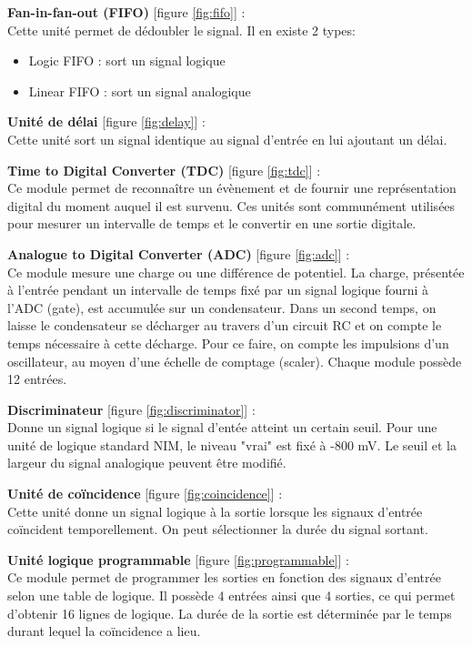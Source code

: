 \textbf{Fan-in-fan-out (FIFO)} [figure  \ref{fig:fifo}] :\\
Cette unité permet de dédoubler le signal. Il en existe 2 types:
\begin{itemize}
\item Logic FIFO : sort un signal logique
\item Linear FIFO : sort un signal analogique
\end{itemize}

\textbf{Unité de délai} [figure \ref{fig:delay}] :\\
Cette unité sort un signal identique au signal d'entrée en lui ajoutant un délai.

\textbf{Time to Digital Converter (TDC)} [figure \ref{fig:tdc}] :\\
Ce module permet de reconnaître un évènement et de fournir une représentation digital du moment auquel il est survenu. Ces unités sont communément utilisées pour mesurer un intervalle de temps et le convertir en une sortie digitale.

\textbf{Analogue to Digital Converter (ADC)} [figure \ref{fig:adc}] :\\
Ce module mesure une charge ou une différence de potentiel. 
La charge, présentée à l’entrée pendant un intervalle de temps fixé par un signal logique fourni à l’ADC (gate), est accumulée sur un condensateur. Dans un second temps, on laisse le condensateur se décharger au travers d’un circuit RC et on compte le temps nécessaire à cette décharge. Pour ce faire, on compte les impulsions d’un oscillateur, au moyen d’une échelle de comptage (scaler). Chaque module possède 12 entrées.

\textbf{Discriminateur} [figure \ref{fig:discriminator}] :\\
Donne un signal logique si le signal d'entée atteint un certain seuil. Pour une unité de logique standard NIM, le niveau "vrai" est fixé à -800 mV. Le seuil et la largeur du signal analogique peuvent être modifié.

\textbf{Unité de coïncidence} [figure \ref{fig:coincidence}] :\\
Cette unité donne un signal logique à la sortie lorsque les signaux d'entrée coïncident temporellement. On peut sélectionner la durée du signal sortant.

\textbf{Unité logique programmable} [figure  \ref{fig:programmable}]  :\\
Ce module permet de programmer les sorties en fonction des signaux d'entrée selon une table de logique. Il possède 4 entrées ainsi que 4 sorties, ce qui permet d'obtenir 16 lignes de logique. La durée de la sortie est déterminée par le temps durant lequel la coïncidence a lieu.

